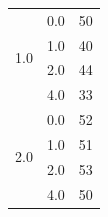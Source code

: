 \begin{longtable}{|c|c|c|c|c|}
\hline
\multirow{4}{*}{1.0} & \multicolumn{2}{c|}{0.0} & \multicolumn{2}{c|}{50} \\
& \multicolumn{2}{c|}{1.0} & \multicolumn{2}{c|}{40} \\
& \multicolumn{2}{c|}{2.0} & \multicolumn{2}{c|}{44} \\
& \multicolumn{2}{c|}{4.0} & \multicolumn{2}{c|}{33} \\
\hline
\multirow{4}{*}{2.0} & \multicolumn{2}{c|}{0.0} & \multicolumn{2}{c|}{52} \\
& \multicolumn{2}{c|}{1.0} & \multicolumn{2}{c|}{51} \\
& \multicolumn{2}{c|}{2.0} & \multicolumn{2}{c|}{53} \\
& \multicolumn{2}{c|}{4.0} & \multicolumn{2}{c|}{50} \\
\hline
\end{longtable}


